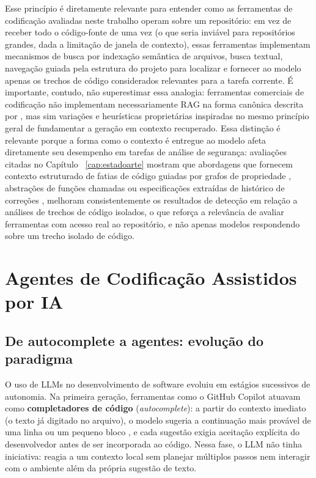 Esse princípio é diretamente relevante para entender como as ferramentas de codificação avaliadas neste trabalho operam sobre um repositório: em vez de receber todo o código-fonte de uma vez (o que seria inviável para repositórios grandes, dada a limitação de janela de contexto), essas ferramentas implementam mecanismos de busca por indexação semântica de arquivos, busca textual, navegação guiada pela estrutura do projeto para localizar e fornecer ao modelo apenas os trechos de código considerados relevantes para a tarefa corrente. É importante, contudo, não superestimar essa analogia: ferramentas comerciais de codificação não implementam necessariamente RAG na forma canônica descrita por  , mas sim variações e heurísticas proprietárias inspiradas no mesmo princípio geral de fundamentar a geração em contexto recuperado. Essa distinção é relevante porque a forma como o contexto é entregue ao modelo afeta diretamente seu desempenho em tarefas de análise de segurança: avaliações citadas no Capítulo ~\ref{cap:estadoarte} mostram que abordagens que fornecem contexto estruturado de fatias de código guiadas por grafos de propriedade \cite{Lekssays2025LLMxCPG}, abstrações de funções chamadas \cite{Yang2025ContextVD} ou especificações extraídas de histórico de correções \cite{Zhu2025SpecGuidedVD} , melhoram consistentemente os resultados de detecção em relação a análises de trechos de código isolados, o que reforça a relevância de avaliar ferramentas com acesso real ao repositório, e não apenas modelos respondendo sobre um trecho isolado de código.


\section{Agentes de Codificação Assistidos por IA}\label{sec:agentes-codificacao}
\subsection{De autocomplete a agentes: evolução do paradigma}\label{subsec:evolucao-agentes}
O uso de LLMs no desenvolvimento de software evoluiu em estágios sucessivos de autonomia. Na primeira geração, ferramentas como o GitHub Copilot atuavam como \textbf{completadores de código} (\textit{autocomplete}): a partir do contexto imediato (o texto já digitado no arquivo), o modelo sugeria a continuação mais provável de uma linha ou um pequeno bloco , e cada sugestão exigia aceitação explícita do desenvolvedor antes de ser incorporada ao código. Nessa fase, o LLM não tinha iniciativa: reagia a um contexto local sem planejar múltiplos passos nem interagir com o ambiente além da própria sugestão de texto.

